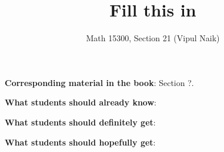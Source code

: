 \documentclass{amsart}
\title{Fill this in}
\author{Math 15300, Section 21 (Vipul Naik)}
\begin{document}
\maketitle

{\bf Corresponding material in the book}: Section ?.

{\bf What students should already know}: 

{\bf What students should definitely get}: 

{\bf What students should hopefully get}:
\end{document}
